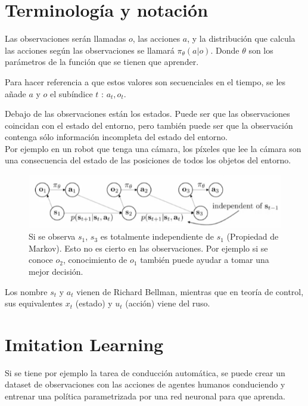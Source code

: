 
\section{Terminología y notación}%
\label{sec:terminología_y_notación}

Las observaciones serán llamadas $o$, las acciones $a$, y la distribución que
calcula las acciones según las observaciones se llamará $\pi_\theta(a|o)$. Donde  $\theta$ son
los parámetros de la función que se tienen que aprender.

Para hacer referencia a que estos valores son secuenciales en el tiempo, se les añade $a$ y $o$
el subíndice $t$ : $a_t, o_t$.

Debajo de las observaciones están los estados. Puede ser que las observaciones
coincidan con el estado del entorno, pero también puede ser que la observación contenga sólo
información incompleta del estado del entorno.\\ Por  ejemplo en un robot que tenga una
cámara, los píxeles que lee la cámara son una consecuencia del estado de las posiciones de todos
los objetos del entorno.

\begin{figure}[htpb]
	\centering
	\includegraphics[width=0.8\linewidth]{figures/2020-06-11-131020_573x121_scrot.png}
    \caption{Si se observa $s_1$,  $s_3$ es totalmente independiente de  $s_1$ (Propiedad de
        Markov). Esto no es
    cierto en las observaciones. Por ejemplo si se conoce $o_2$, conocimiento de  $o_1$
también puede ayudar a tomar una mejor decisión.}
\end{figure} 

Los nombre $s_t$ y $a_t$ vienen de Richard Bellman, mientras que en teoría de control, sus
equivalentes $x_t$ (estado) y $u_t$ (acción) viene del ruso.

\section{Imitation Learning}%
\label{sec:imitation_learning}

Si se tiene por ejemplo la tarea de conducción automática, se puede crear un dataset de
observaciones con las acciones de agentes humanos conduciendo y entrenar una política
parametrizada por una red neuronal para que aprenda.


